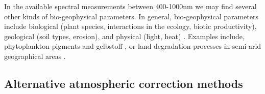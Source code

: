 In the available spectral measurements between 400-1000nm we may find several 
other kinds of bio-geophysical parameters. In general, bio-geophysical parameters 
include biological (plant species, interactions in the ecology, biotic 
productivity), geological (soil types, erosion), and physical (light, heat) \cite{website:esa_bio-geophysical}. 
Examples include, phytoplankton pigments and gelbstoff \cite{Lee:02}, or land degradation 
processes in semi-arid geographical areas \cite{1025751}.

\subsection{Alternative atmospheric correction methods}